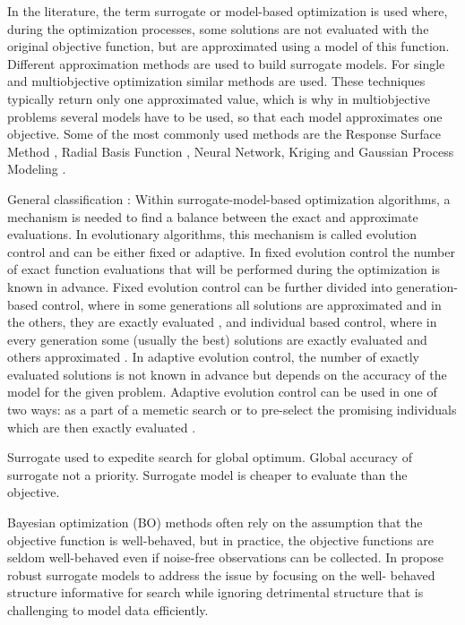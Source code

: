         In the literature, the term surrogate or model-based optimization is used where, during the optimization processes, some solutions are not evaluated with the original objective function, but are approximated using a model of this function. Different approximation methods are used to build surrogate models. For single and multiobjective optimization similar methods are used. 
        These techniques typically return only one approximated value, which is why in multiobjective problems several models have to be used, so that each model approximates one objective. Some of the most commonly used methods are the Response Surface Method \cite{ResponseSurface}, Radial Basis Function \cite{Rasmussen2004}, Neural Network, Kriging \cite{Woodard00} and Gaussian Process Modeling \cite{RasmussenN10, RasmussenW06}.

        General classification \cite{MlakarPTF15}:
        Within surrogate-model-based optimization algorithms, a mechanism is needed to find a balance between the exact and approximate evaluations. In evolutionary algorithms, this mechanism is called evolution control \cite{Jin05} and can be either fixed or adaptive. In fixed evolution control the number of exact function evaluations that will be performed during the optimization is known in advance. Fixed evolution control can be further divided into generation-based control, where in some generations all solutions are approximated and in the others, they are exactly evaluated \cite{DebN07}, and individual based control, where in every generation some (usually the best) solutions are exactly evaluated and others approximated \cite{Grierson1993}. In adaptive evolution control, the number of exactly evaluated solutions is not known in advance but depends on the accuracy of the model for the given problem. Adaptive evolution control can be used in one of two ways: as a part of a memetic search or to pre-select the promising individuals which are then exactly evaluated \cite{PilatN12}.

        Surrogate used to expedite search for global optimum. Global accuracy of surrogate
        not a priority. Surrogate model is cheaper to evaluate than the objective.

        Bayesian optimization (BO) methods often rely on the assumption that the objective function is well-behaved, but in practice, the objective functions are seldom well-behaved even if noise-free observations can be collected. In \cite{bodin2019modulating} propose robust surrogate models to address the issue by focusing on the well- behaved structure informative for search while ignoring detrimental structure that is challenging to model data efficiently.

